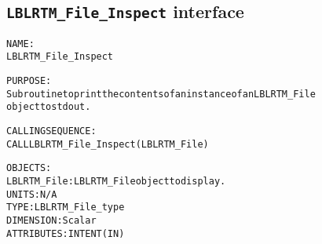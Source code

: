 \subsection{\texttt{LBLRTM\_File\_Inspect} interface}
  \label{sec:LBLRTM_File_Inspect_interface}
  \begin{alltt}
 
  NAME:
        LBLRTM_File_Inspect
 
  PURPOSE:
        Subroutine to print the contents of an instance of an LBLRTM_File
        object to stdout.
 
  CALLING SEQUENCE:
        CALL LBLRTM_File_Inspect( LBLRTM_File )
 
  OBJECTS:
        LBLRTM_File:  LBLRTM_File object to display.
                       UNITS:      N/A
                       TYPE:       LBLRTM_File_type
                       DIMENSION:  Scalar
                       ATTRIBUTES: INTENT(IN)
 
  \end{alltt}
